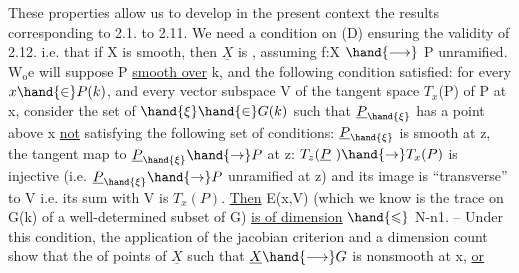 These properties allow us to develop in the present context
the results corresponding to 2.1. to 2.11. We need a condition on (D)
ensuring the validity of 2.12. i.e. that if X is smooth, then $\underline{X}$ is
, assuming f:X $\hand{\longrightarrow}$ P unramified. W$_{\mathrm{o}}$e will suppose
 P \uline{smooth over} k, and the following condition satisfied: for
every $x \hand{\in} P(k)$, and every vector subspace V  of the tangent space
$T_x$(P) of P at x, consider the set  of $\hand{\xi} \hand{\in} G(k)$ such that
$\underline{P}_{\hand{\xi}}$ has a point above x 
\uline{not} satisfying the following set of conditions: $\underline{P}_{\hand{\xi}}$ is smooth at
z, 
the tangent map to $\underline{P}_{\hand{\xi}} \hand{\rightarrow} P$ at z: $T_z(\underline{P}\ ) \hand{\rightarrow} T_x(P)$ is injective
(i.e. $\underline{P}_{\hand{\xi}} \hand{\rightarrow} P$ unramified at z) and its image is ``transverse'' to V
i.e. its sum with V is $T_x(P)$. \uline{Then} E(x,V) (which we know
is the trace on G(k) of a well-determined   subset of G)
\uline{is of dimension} $\hand{\leqslant}$ N-n1. -- Under this condition,  the appli\unsure{:|-}cation
of the jacobian criterion and a dimension count show that
the  of points of $\underline{X}$ such that $\underline{X} \hand{\longrightarrow} G$ is nonsmooth at x, \uline{or}

